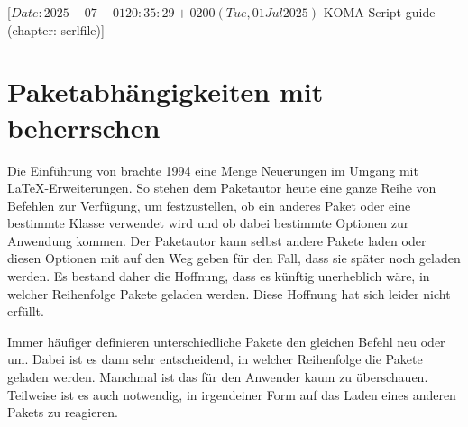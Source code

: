 %
%
%
%
%
%
%

%
                 [$Date: 2025-07-01 20:35:29 +0200 (Tue, 01 Jul 2025) $
                  KOMA-Script guide (chapter: scrlfile)]

\chapter{Paketabhängigkeiten mit 
  beherrschen}

\BeginIndexGroup
{}

Die Einführung von \LaTeXe{} brachte 1994 eine Menge Neuerungen im Umgang mit
\LaTeX-Erweiterungen. So stehen dem Paketautor heute eine ganze Reihe von
Befehlen zur Verfügung, um festzustellen, ob ein anderes Paket oder eine
bestimmte Klasse verwendet wird und ob dabei bestimmte Optionen zur Anwendung
kommen. Der Paketautor kann selbst andere Pakete laden oder diesen Optionen
mit auf den Weg geben für den Fall, dass sie später noch geladen werden. Es
bestand daher die Hoffnung, dass es künftig unerheblich wäre, in welcher
Reihenfolge Pakete geladen werden. Diese Hoffnung hat sich leider nicht
erfüllt.

Immer häufiger definieren unterschiedliche Pakete den
gleichen Befehl neu oder um. Dabei ist es dann sehr entscheidend, in welcher
Reihenfolge die Pakete geladen werden. Manchmal ist das für den Anwender kaum
zu überschauen. Teilweise ist es auch notwendig, in irgendeiner Form auf das
Laden eines anderen Pakets zu reagieren.

